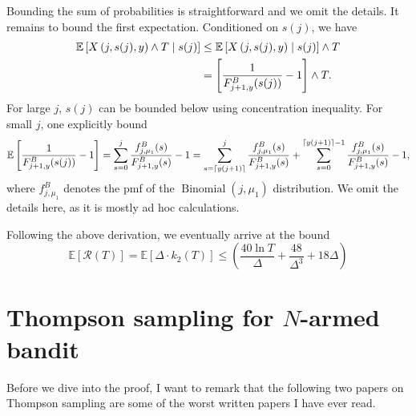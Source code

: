 \documentclass[letterpaper,11pt]{article}
\begin{document}
Bounding the sum of probabilities is straightforward and we omit the details.
It remains to bound the first expectation. 
Conditioned on $s(j)$, we have
\begin{equation*}
\begin{aligned}
    \mathbb{E} \left[ X\left(j, s(j), y\right) \wedge T \mid s(j)\right] &\leq \mathbb{E} \left[ X\left(j, s(j), y\right) \mid s(j)\right] \wedge T\\
    &= \left[\frac{1}{F^B_{j+1, y}(s(j))} - 1\right] \wedge T. 
\end{aligned}
\end{equation*}
For large $j$, $s(j)$ can be bounded below using concentration inequality.
For small $j$, one explicitly bound 
\begin{equation*}
    \mathbb{E} \left[\frac{1}{F^B_{j+1, y}(s(j))} - 1\right] = \sum_{s=0}^{j} \frac{f_{j,\mu_1}^B(s)}{F_{j+1, y}^B(s)} - 1 = \sum_{s=\lceil y(j+1)\rceil}^j \frac{f_{j, \mu_1}^B(s)}{F_{j+1, y}^B(s)} + \sum_{s=0}^{\lceil y(j+1)\rceil-1} \frac{f_{j, \mu_1}^B(s)}{F_{j+1, y}^B(s)} - 1,
\end{equation*}
where $f_{j,\mu_1}^B$ denotes the pmf of the $\operatorname{Binomial}(j, \mu_1)$ distribution. We omit the details here, as it is mostly ad hoc calculations. 

Following the above derivation, we eventually arrive at the bound
$$
\mathbb{E}[\mathcal{R}(T)]=\mathbb{E}\left[\Delta \cdot k_2(T)\right] \leq\left(\frac{40 \ln T}{\Delta}+\frac{48}{\Delta^3}+18 \Delta\right)
$$

\newpage

\section{Thompson sampling for \texorpdfstring{$N$}{N}-armed bandit}

Before we dive into the proof, I want to remark that the following two papers on Thompson sampling are some of the worst written papers I have ever read. 
\end{document}
